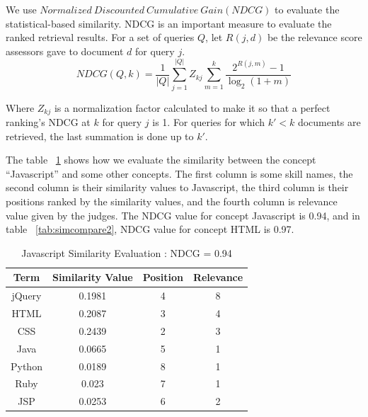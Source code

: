 We use $ Normalized~Discounted~Cumulative~Gain ( NDCG )$ to evaluate the statistical-based similarity. NDCG is an important measure to evaluate the ranked retrieval results. For a set of queries $Q$, let $R(j,d)$ be the relevance score assessors gave to document $d$ for query $j$.
       $$ NDCG(Q,k) = \frac {1}{|Q|} \sum_{j=1}^{|Q|}{Z_{kj}} \sum_{m=1}^{k} \frac{2^{R(j,m)} - 1}{ \log_2(1+m)} $$

Where $Z_{kj}$ is a normalization factor calculated to make it so that a perfect ranking's NDCG at $k$ for query $j$ is 1. For queries for which $k' < k$ documents are retrieved, the last summation is done up to $k'$.

The table ~\ref{tab:simcompare1} shows how we evaluate the similarity between the concept ``Javascript'' and some other concepts. The first column is some skill names, the second column is their similarity values to Javascript, the third column is their positions ranked by the similarity values, and the fourth column is relevance value given by the judges. The NDCG value for concept Javascript is 0.94, and in table ~\ref{tab:simcompare2},  NDCG value for concept HTML is 0.97.

\begin{table}
\centering
\caption{ Javascript Similarity Evaluation : NDCG = 0.94 }
\begin{tabular}{ | c | c | c  | c |  }
 \hline
    Term     &  Similarity Value  &  Position   & Relevance     \\  \hline
    jQuery   &  0.1981            &      4      &   8        \\
     HTML    &  0.2087            &      3      &   4         \\
     CSS     &  0.2439            &      2      &   3   \\
     Java    &  0.0665            &      5      &   1   \\
    Python   &  0.0189            &      8      &   1   \\
     Ruby    &  0.023             &      7      &   1    \\
     JSP     &  0.0253            &      6      &   2    \\
 \hline
\end{tabular}
\label{tab:simcompare1}
\end{table}



